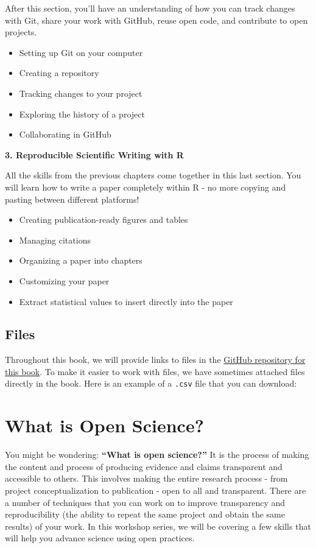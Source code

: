 \documentclass[
]{book}
\providecommand{\tightlist}{%
  \setlength{\itemsep}{0pt}\setlength{\parskip}{0pt}}
\begin{document}
After this section, you'll have an understanding of how you can track changes
with Git, share your work with GitHub, reuse open code, and contribute to open
projects.

\begin{itemize}
\tightlist
\item
  Setting up Git on your computer
\item
  Creating a repository
\item
  Tracking changes to your project
\item
  Exploring the history of a project
\item
  Collaborating in GitHub
\end{itemize}

\textbf{3. Reproducible Scientific Writing with R}

All the skills from the previous chapters come together in this last section.
You will learn how to write a paper completely within R - no more copying and
pasting between different platforms!

\begin{itemize}
\tightlist
\item
  Creating publication-ready figures and tables
\item
  Managing citations
\item
  Organizing a paper into chapters
\item
  Customizing your paper
\item
  Extract statistical values to insert directly into the paper
\end{itemize}

\section{Files}\label{files}

Throughout this book, we will provide links to files in the \href{https://github.com/christelinda-laureijs/Open-Science-Skills-in-R-Book}{GitHub repository for this book}. To make it easier to work with files, we have sometimes attached files directly in the book. Here is an example of a \texttt{.csv} file that you can download:

\chapter*{What is Open Science?}\label{what-is-open-science}

You might be wondering: \textbf{``What is open science?''} It is the process of making the content and process of producing evidence and claims transparent and accessible to others. This involves making the entire research process - from project conceptualization to publication - open to all and transparent. There are a number of techniques that you can work on to improve transparency and reproducibility (the ability to repeat the same project and obtain the same results) of your work. In this workshop series, we will be covering a few skills that will help you advance science using open practices.
\end{document}
